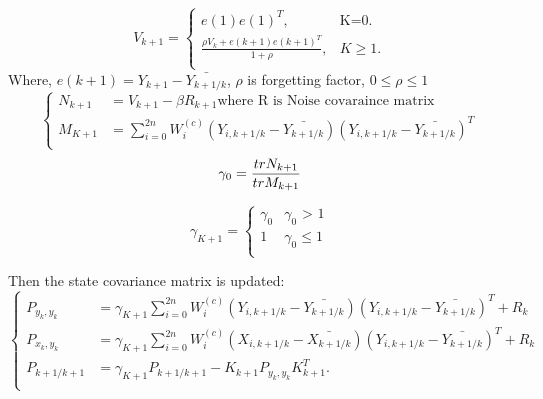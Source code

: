 \begin{equation}\label{eq:AUKF_fadding_factor}
	V_{k+1}=\begin{cases}
	  e(1)e(1)^{T}, & \text{K=0}.\\
	  \frac{\rho V_k + e(k+1)e(k+1)^{T}}{1 + \rho}, & \text{$K \geq 1$}.\\
	\end{cases}
\end{equation}
Where, $e(k+1) = Y_{k+1} - \bar{Y_{k+1/k}}$, $\rho$ is forgetting factor, $ 0 \leq  \rho \leq 1 $ \\

\begin{equation}
	\begin{cases}
	  N_{k+1} & = V_{k+1} - \beta R_{k+1} \text{where R is Noise covaraince matrix}\\
      M_{K+1} & =  \sum_{i = 0}^{2n} W_i^{(c)} (Y_{i,k+1/k}  - \bar{Y_{k+1/k}})(Y_{i,k+1/k}   - \bar{Y_{k+1/k}  })^{T} \\
	\end{cases}
\end{equation}
\begin{equation}
    \gamma _{0} = \frac{tr N_{k+1} }{ tr M_{k+1}} \\
\end{equation}

\begin{equation}
    \gamma _{K+1}=\begin{cases}
                    \gamma _{0}   & \text{$\gamma _{0}$  > 1}\\
                    1   & \gamma _{0}  \leq 1 \\
    \end{cases}
\end{equation}

Then the state covariance matrix is updated: \\
\begin{equation}
    \begin{cases}
    P_{y_k,y_k}& = \gamma _{K+1} \sum_{i = 0}^{2n} W_i^{(c)} (Y_{i,k+1/k}  - \bar{Y_{k+1/k}})(Y_{i,k+1/k}   - \bar{Y_{k+1/k}  })^{T} + R_k \\
    P_{x_k,y_k}& = \gamma _{K+1} \sum_{i = 0}^{2n} W_i^{(c)} (X_{i,k+1/k}  - \bar{X_{k+1/k}})(Y_{i,k+1/k}   - \bar{Y_{k+1/k}  })^{T} + R_k \\
    P_{k+1/k+1}& = \gamma _{K+1} P_{k+1/k+1} - K_{k+1} P_{y_k,y_k} K_{k+1}^T .\\
    \end{cases}
\end{equation}


